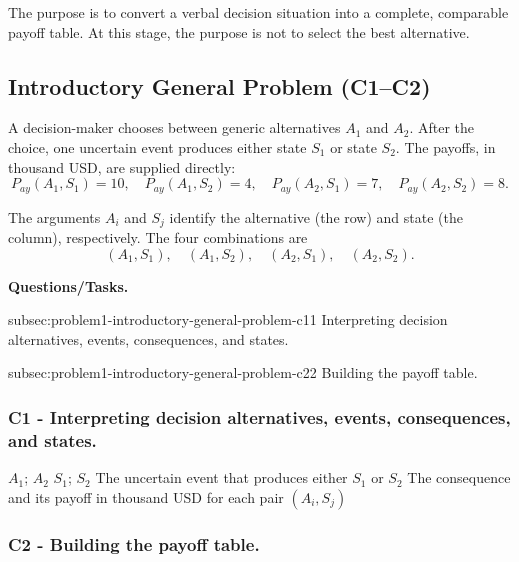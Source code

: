 	The purpose is to convert a verbal decision situation into a complete, comparable payoff table. At this stage, the purpose is not to select the best alternative.
	
	\subsection{Introductory General Problem (C1--C2)} 
	\label{sec:problem1-introductory-general-problem-c1-c2} 
	
	A decision-maker chooses between generic alternatives $A_1$ and $A_2$. After the choice, one uncertain event produces either state $S_1$ or state $S_2$. The payoffs, in thousand USD, are supplied directly:
	\[
	P_{ay}(A_1,S_1)=10,\quad
	P_{ay}(A_1,S_2)=4,\quad
	P_{ay}(A_2,S_1)=7,\quad
	P_{ay}(A_2,S_2)=8.
	\]
	
	The arguments $A_i$ and $S_j$ identify the alternative (the row) and state (the column), respectively. The four combinations are
	\[
	(A_1,S_1),\quad(A_1,S_2),\quad(A_2,S_1),\quad(A_2,S_2).
	\]
	
	\textbf{Questions/Tasks.}
	\begin{enumerate}
		\CriterionTask
		{subsec:problem1-introductory-general-problem-c1}{1}
		{Interpreting decision alternatives, events, consequences, and states.}
		
		\CriterionTask
		{subsec:problem1-introductory-general-problem-c2}{2}
		{Building the payoff table.}
	\end{enumerate}
	
	\subsubsection*{C1 - Interpreting decision alternatives, events, consequences, and states.}
	\label{subsec:problem1-introductory-general-problem-c1}
	
	\DecisionElementsTable
	{$A_1$; $A_2$}
	{$S_1$; $S_2$}
	{The uncertain event that produces either $S_1$ or $S_2$}
	{The consequence and its payoff in thousand USD for each pair $(A_i,S_j)$}
	
	
	\subsubsection*{C2 - Building the payoff table.}
	\label{subsec:problem1-introductory-general-problem-c2}
	
